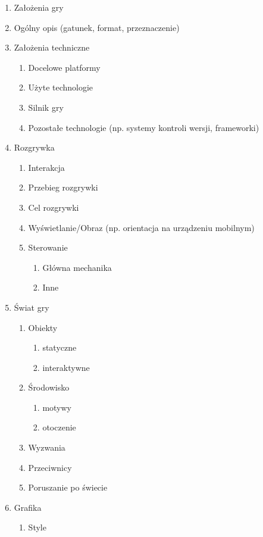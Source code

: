 \documentclass[openright]{xmgr}
\begin{document}
\begin{enumerate}
  \item Założenia gry
  \item Ogólny opis (gatunek, format, przeznaczenie)
  \item Założenia techniczne
  \begin{enumerate}
    \item Docelowe platformy
    \item Użyte technologie
    \item Silnik gry
    \item Pozostałe technologie (np. systemy kontroli wersji, frameworki)
  \end{enumerate}
  \item Rozgrywka
  \begin{enumerate}
    \item Interakcja
    \item Przebieg rozgrywki
    \item Cel rozgrywki
    \item Wyświetlanie/Obraz (np. orientacja na urządzeniu mobilnym)
    \item Sterowanie
    \begin{enumerate}
      \item Główna mechanika
      \item Inne
    \end{enumerate}
  \end{enumerate}
  \item Świat gry
  \begin{enumerate}
    \item Obiekty
    \begin{enumerate}
      \item statyczne
      \item interaktywne
   \end{enumerate}
   \item Środowisko
   \begin{enumerate}
      \item motywy
      \item otoczenie
    \end{enumerate}
    \item Wyzwania 
    \item Przeciwnicy
    \item Poruszanie po świecie
  \end{enumerate}
  \item Grafika
  \begin{enumerate}
    \item Style

\end{enumerate}
\end{enumerate}
\end{document}
